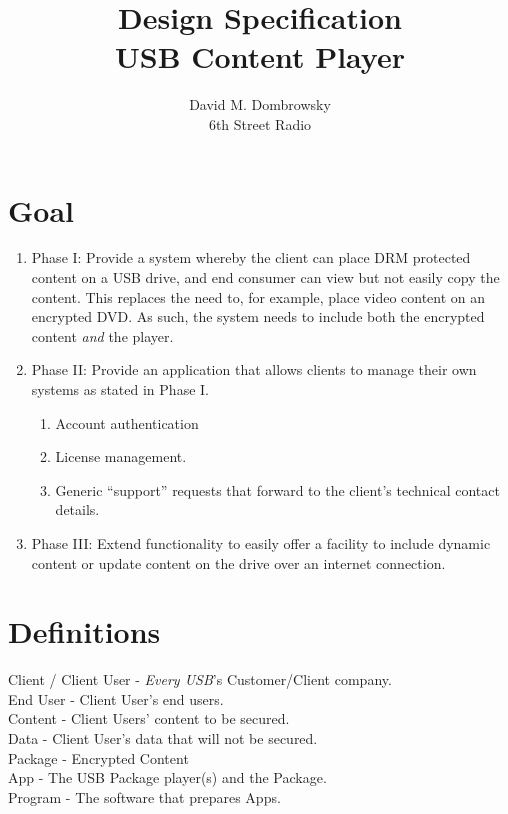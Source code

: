\documentclass{article}
\title{Design Specification \\ USB Content Player}
\author{David M. Dombrowsky \\ 6th Street Radio}
\begin{document}
\maketitle

\section{Goal}

\begin{enumerate}

\item Phase I: Provide a system whereby the client can place DRM
protected content on a USB drive, and end consumer can view but not
easily copy the content.  This replaces the need to, for example,
place video content on an encrypted DVD.  As such, the system needs to
include both the encrypted content {\it and} the player.

\item Phase II: Provide an application that allows clients to manage
their own systems as stated in Phase I.
    \begin{enumerate}
    \item Account authentication
    \item License management.
    \item Generic “support” requests that forward to the client’s 
          technical contact details.
    \end{enumerate}

\item Phase III: Extend functionality to easily offer a facility to
include dynamic content or update content on the drive over an
internet connection.

\end{enumerate}
\newpage
\tableofcontents
\listoffigures
\newpage

\section{Definitions}
Client / Client User - {\it Every USB}'s Customer/Client company.\\
End User - Client User's end users.\\
Content - Client Users' content to be secured.\\
Data - Client User's data that will not be secured.\\
Package - Encrypted Content\\
App - The USB Package player(s) and the Package.\\
Program - The software that prepares Apps.\\
\end{document}
